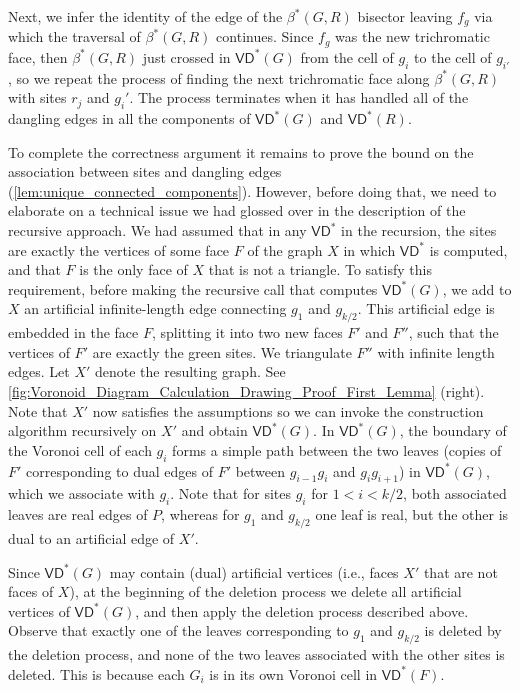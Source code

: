 \documentclass{article}
\newcommand{\VD}{\textsf{VD}}
\newcommand{\X}{X}
\begin{document}
Next, we infer the identity of the edge of the $\beta^*(G,R)$ bisector leaving $f_g$ via which the traversal of $\beta^*(G,R)$ continues. Since  $f_g$ was the new trichromatic face, then $\beta^*(G,R)$ just crossed in $\VD^*(G)$ from the cell of $g_i$ to the cell of $g_{i'}$, so we repeat the process of finding the next trichromatic face along $\beta^*(G,R)$ with sites $r_j$ and $g_i'$.  The process terminates when it has handled all of the dangling edges in all the components of $\VD^*(G)$ and $\VD^*(R)$.


To complete the correctness argument it remains to prove the bound on the association between sites and dangling edges (\cref{lem:unique_connected_components}). However, before doing that, we need to elaborate on a technical issue we had glossed over in the description of the recursive approach.
We had assumed that in any $\VD^*$ in the recursion, the sites are exactly the vertices of some face $F$ of the graph $\X$  in which $\VD^*$ is computed, and that $F$ is the only face of $\X$ that is not a triangle.
To satisfy this requirement, before making the recursive call that computes $\VD^*(G)$, we add to $\X$ an artificial infinite-length edge connecting $g_1$ and $g_{k/2}$. This artificial edge is embedded in the face $F$, splitting it into two new faces $F'$ and $F''$, such that the vertices of $F'$ are exactly the green sites.
We triangulate $F''$ with infinite length edges.
Let $\X'$ denote the resulting graph.
See \cref{fig:Voronoid_Diagram_Calculation_Drawing_Proof_First_Lemma} (right).
Note that $\X'$ now satisfies the assumptions so we can invoke the construction algorithm recursively on $\X'$ and obtain $\VD^*(G)$.
In $\VD^*(G)$, the boundary of the Voronoi cell of each $g_i$ forms a simple path between the two leaves (copies of $F'$ corresponding to dual edges of $F'$ between $g_{i-1}g_i$ and $g_i g_{i+1}$) in $\VD^*(G)$, which we associate with $g_i$.
Note that for sites $g_i$ for $1<i<k/2$, both associated leaves are real edges of $P$, whereas for $g_1$ and $g_{k/2}$ one leaf is real, but the other is dual to an artificial edge of $\X'$.


Since $\VD^*(G)$ may contain (dual) artificial vertices (i.e., faces $\X'$ that are not faces of $\X$), at the beginning of the deletion process we delete all artificial vertices of $\VD^*(G)$, and then apply the deletion process described above.
Observe that exactly one of the leaves corresponding to $g_1$ and $g_{k/2}$ is deleted by the deletion process, and none of the two leaves associated with the other sites is deleted. This is because each $G_i$ is in its own Voronoi cell in $\VD^*(F)$.
\end{document}
